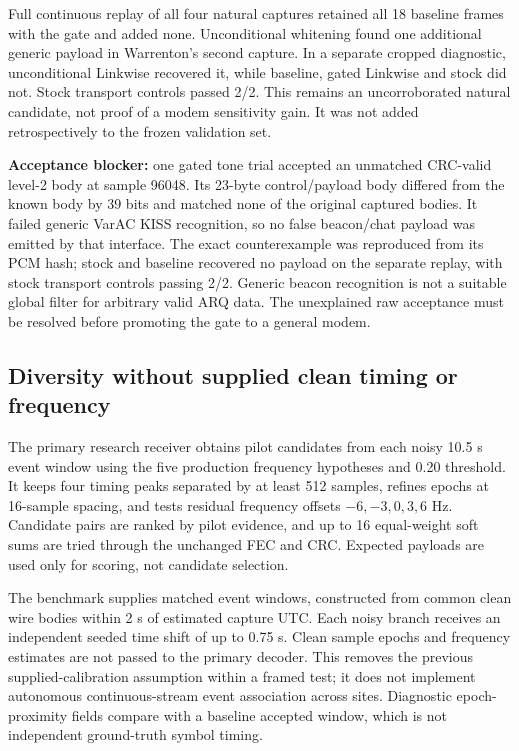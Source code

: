\documentclass[11pt,a4paper]{article}
\begin{document}
Full continuous replay of all four natural captures retained all 18 baseline
frames with the gate and added none. Unconditional whitening found one
additional generic payload in Warrenton's second capture. In a separate
cropped diagnostic, unconditional Linkwise recovered it, while baseline,
gated Linkwise and stock did not. Stock transport controls passed 2/2.
This remains an uncorroborated natural candidate, not proof of a modem
sensitivity gain. It was not added retrospectively to the frozen validation set.

\textbf{Acceptance blocker:} one gated tone trial accepted an unmatched CRC-valid
level-2 body at sample 96048. Its 23-byte control/payload body differed from
the known body by 39 bits and matched none of the original captured bodies.
It failed generic VarAC KISS recognition, so no false beacon/chat payload
was emitted by that interface. The exact counterexample was reproduced from
its PCM hash; stock and baseline recovered no payload on the separate replay,
with stock transport controls passing 2/2. Generic beacon recognition is not
a suitable global filter for arbitrary valid ARQ data. The unexplained raw
acceptance must be resolved before promoting the gate to a general modem.

\subsection{Diversity without supplied clean timing or frequency}
The primary research receiver obtains pilot candidates from each noisy
10.5 s event window using the five production frequency hypotheses and
0.20 threshold. It keeps four timing peaks separated by at least 512 samples,
refines epochs at 16-sample spacing, and tests residual frequency offsets
$-6,-3,0,3,6$ Hz. Candidate pairs are ranked by pilot evidence, and up to
16 equal-weight soft sums are tried through the unchanged FEC and CRC.
Expected payloads are used only for scoring, not candidate selection.

The benchmark supplies matched event windows, constructed from common clean
wire bodies within 2 s of estimated capture UTC. Each noisy branch receives
an independent seeded time shift of up to 0.75 s. Clean sample epochs and
frequency estimates are not passed to the primary decoder. This removes the
previous supplied-calibration assumption within a framed test; it does not
implement autonomous continuous-stream event association across sites.
Diagnostic epoch-proximity fields compare with a baseline accepted window,
which is not independent ground-truth symbol timing.
\end{document}
